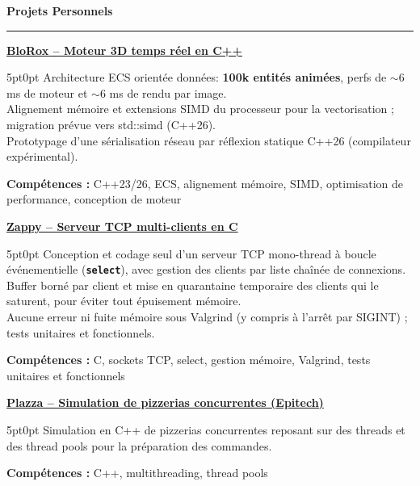 \documentclass[9pt]{extarticle}
\begin{document}
\par\vspace{5pt}

{\large\bfseries Projets Personnels}
\par\vspace{-8pt}
\rule{\linewidth}{0.4pt}
\par\vspace{5pt}

\underline{\bfseries \href{https://github.com/paulogarithm/blorox}{BloRox} -- Moteur 3D temps réel en C++}
\par
\begin{adjustwidth}{5pt}{0pt}
	Architecture ECS orientée données: {\bfseries 100k entités animées}, perfs de $\sim$6 ms de moteur et $\sim$6 ms de rendu par image. \\
	Alignement mémoire et extensions SIMD du processeur pour la vectorisation ; migration prévue vers {\ttfamily std::simd} (C++26). \\
	Prototypage d'une sérialisation réseau par réflexion statique C++26 (compilateur expérimental).
\end{adjustwidth}
\par
{\bfseries Compétences :} C++23/26, ECS, alignement mémoire, SIMD, optimisation de performance, conception de moteur

\par\vspace{8pt}

\underline{\bfseries Zappy -- Serveur TCP multi-clients en C}
\par
\begin{adjustwidth}{5pt}{0pt}
    Conception et codage seul d'un serveur TCP mono-thread à boucle événementielle ({\bfseries \texttt{select}}), avec gestion des clients par liste chaînée de connexions. \\
    Buffer borné par client et mise en quarantaine temporaire des clients qui le saturent, pour éviter tout épuisement mémoire. \\
    Aucune erreur ni fuite mémoire sous Valgrind (y compris à l'arrêt par SIGINT) ; tests unitaires et fonctionnels.
\end{adjustwidth}
\par
{\bfseries Compétences :} C, sockets TCP, select, gestion mémoire, Valgrind, tests unitaires et fonctionnels

\par\vspace{8pt}

\underline{\bfseries Plazza -- Simulation de pizzerias concurrentes (Epitech)}
\par
\begin{adjustwidth}{5pt}{0pt}
    Simulation en C++ de pizzerias concurrentes reposant sur des threads et des thread pools pour la préparation des commandes.
\end{adjustwidth}
\par
{\bfseries Compétences :} C++, multithreading, thread pools
\end{document}
